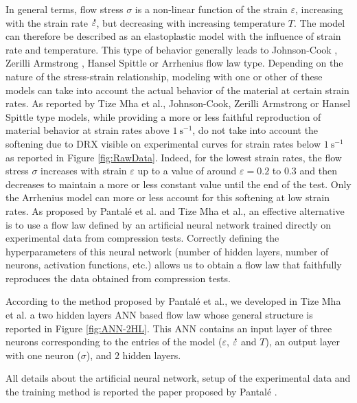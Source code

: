 \documentclass[metals,article,submit,pdftex,moreauthors]{Definitions/mdpi}
\makeatletter
\DeclareRobustCommand{\mdot}[1]{\accentset{\mbox{\bfseries .}}{#1}}
\DeclareRobustCommand{\eal}{et al.\@\xspace}
\DeclareRobustCommand{\ps}{\text{s}^{-1}}
\makeatother
\begin{document}
In general terms, flow stress $\sigma$ is a non-linear function of the strain $\varepsilon$, increasing with the strain rate $\mdot\varepsilon$, but decreasing with increasing temperature $T$.
The model can therefore be described as an elastoplastic model with the influence of strain rate and temperature.
This type of behavior generally leads to Johnson-Cook \cite{Johnson-1983}, Zerilli Armstrong \cite{Zerilli-1987}, Hansel Spittle \cite{Hensel-1978} or Arrhenius \cite{Sellars-1966} flow law type.
Depending on the nature of the stress-strain relationship, modeling with one or other of these models can take into account the actual behavior of the material at certain strain rates.
As reported by Tize Mha \eal \cite{TizeMha-2023}, Johnson-Cook, Zerilli Armstrong or Hansel Spittle type models, while providing a more or less faithful reproduction of material behavior at strain rates above $1~\ps$, do not take into account the softening due to DRX visible on experimental curves for strain rates below $1~\ps$ as reported in Figure \ref{fig:RawData}.
Indeed, for the lowest strain rates, the flow stress $\sigma$ increases with strain $\varepsilon$ up to a value of around $\varepsilon=0.2$ to $0.3$ and then decreases to maintain a more or less constant value until the end of the test.
Only the Arrhenius model can more or less account for this softening at low strain rates.
As proposed by Pantalé \eal \cite{Pantale-2021, Pantale-2023} and Tize Mha \eal \cite{TizeMha-2023}, an effective alternative is to use a flow law defined by an artificial neural network trained directly on experimental data from compression tests.
Correctly defining the hyperparameters of this neural network (number of hidden layers, number of neurons, activation functions, etc.) allows us to obtain a flow law that faithfully reproduces the data obtained from compression tests.

According to the method proposed by Pantalé \eal \cite{Pantale-2021, Pantale-2023}, we developed in Tize Mha \eal \cite{TizeMha-2023} a two hidden layers ANN based flow law whose general structure is reported in Figure \ref{fig:ANN-2HL}.
This ANN contains an input layer of three neurons corresponding to the entries of the model ($\varepsilon$, $\mdot\varepsilon$ and $T$), an output layer with one neuron ($\sigma$), and $2$ hidden layers.

All details about the artificial neural network, setup of the experimental data and the training method is reported the paper proposed by Pantalé \cite{Pantale-2023}.
\end{document}
